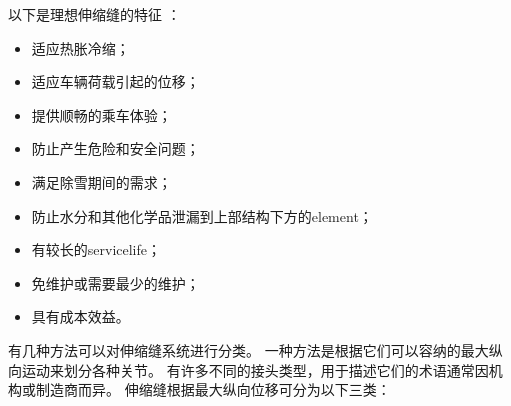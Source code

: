 以下是理想伸缩缝的特征 \cite{lee1994b}：
\begin{itemize}
  \item 适应热胀冷缩；
  \item 适应车辆荷载引起的位移；
  \item 提供顺畅的乘车体验；
  \item 防止产生危险和安全问题；
  \item 满足除雪期间的需求；
  \item 防止水分和其他化学品泄漏到上部结构下方的\gls*{element}；
  \item 有较长的\gls*{servicelife}；
  \item 免维护或需要最少的维护；
  \item 具有成本效益。
\end{itemize}

有几种方法可以对伸缩缝系统进行分类。 一种方法是根据它们可以容纳的最大纵向运动来划分各种关节。 有许多不同的接头类型，用于描述它们的术语通常因机构或制造商而异。 伸缩缝根据最大纵向位移可分为以下三类：


